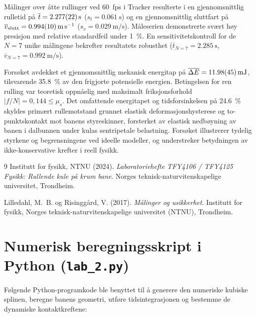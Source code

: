 \documentclass[11pt,a4paper]{article}
\begin{document}
Målinger over åtte rullinger ved \SI{60}{fps} i Tracker resulterte i en gjennomsnittlig rulletid på $\overline{t} = \SI{2,277 \pm 0,022}{\second}$ ($s_t = \SI{0,061}{\second}$) og en gjennomsnittlig sluttfart på $\overline{v}_{\text{slutt}} = \SI{0,994 \pm 0,010}{\meter\per\second}$ ($s_v = \SI{0,029}{\meter\per\second}$). Måleserien demonstrerte svært høy presisjon med relative standardfeil under \SI{1}{\percent}. En sensitivitetskontroll for de $N = 7$ unike målingene bekrefter resultatets robusthet ($\overline{t}_{N=7} = \SI{2,285}{\second}$, $\overline{v}_{N=7} = \SI{0,992}{\meter\per\second}$).

Forsøket avdekket et gjennomsnittlig mekanisk energitap på $\overline{\Delta E} = \SI{11,98 \pm 0,45}{\milli\joule}$, tilsvarende \SI{35,8}{\percent} av den frigjorte potensielle energien. Betingelsen for ren rulling var teoretisk oppnåelig med maksimalt friksjonsforhold $|f/N| = 0{,}144 \le \mu_s$. Det omfattende energitapet og tidsforsinkelsen på \SI{24,6}{\percent} skyldes primært rullemotstand grunnet elastisk deformasjonshysterese og to-punktskontakt mot banens styreskinner, forsterket av elastisk nedbøyning av banen i dalbunnen under kulas sentripetale belastning. Forsøket illustrerer tydelig styrkene og begrensningene ved ideelle modeller, og understreker betydningen av ikke-konservative krefter i reell fysikk.

\begin{thebibliography}{9}
    Institutt for fysikk, NTNU (2024). 
    \emph{Laboratoriehefte TFY4106 / TFY4125 Fysikk: Rullende kule på krum bane}. 
    Norges teknisk-naturvitenskapelige universitet, Trondheim.

    Lilledahl, M.~B. og Risinggård, V. (2017). 
    \emph{Målinger og usikkerhet}. 
    Institutt for fysikk, Norges teknisk-naturvitenskapelige universitet (NTNU), Trondheim.
\end{thebibliography}

\clearpage

\appendix
\section{Numerisk beregningsskript i Python (\texttt{lab\_2.py})}
\label{app:kode}
Følgende Python-programkode ble benyttet til å generere den numeriske kubiske splinen, beregne banens geometri, utføre tidsintegrasjonen og bestemme de dynamiske kontaktkreftene:
\end{document}
